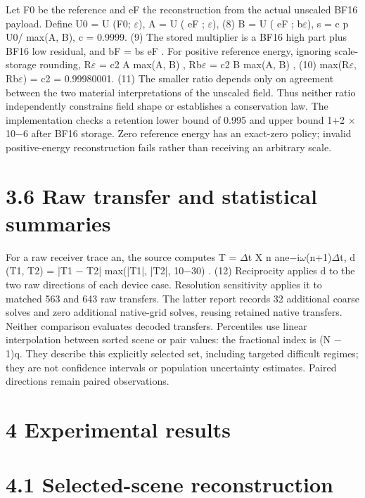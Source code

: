 \documentclass[11pt]{article}
\begin{document}
Let F0 be the reference and eF the reconstruction from the actual unscaled BF16 payload. Define
U0 = U (F0; \ensuremath{\varepsilon}), A = U ( eF ; \ensuremath{\varepsilon}), (8)
B = U ( eF ; b\ensuremath{\varepsilon}), s = c
p
U0/ max(A, B), c = 0.9999. (9)
The stored multiplier is a BF16 high part plus BF16 low residual, and bF = bs eF . For positive
reference energy, ignoring scale-storage rounding,
R\ensuremath{\varepsilon} = c2 A
max(A, B) , Rb\ensuremath{\varepsilon} = c2 B
max(A, B) , (10)
max(R\ensuremath{\varepsilon}, Rb\ensuremath{\varepsilon}) = c2 = 0.99980001. (11)
The smaller ratio depends only on agreement between the two material interpretations of the
unscaled field. Thus neither ratio independently constrains field shape or establishes a conservation
law. The implementation checks a retention lower bound of 0.995 and upper bound 1+2 \ensuremath{\times}10\ensuremath{-}6 after
BF16 storage. Zero reference energy has an exact-zero policy; invalid positive-energy reconstruction
fails rather than receiving an arbitrary scale.

\section*{3.6 Raw transfer and statistical summaries}

For a raw receiver trace an, the source computes
T = \ensuremath{\Delta}t
X
n
ane\ensuremath{-}i\ensuremath{\omega}(n+1)\ensuremath{\Delta}t, d (T1, T2) = |T1 \ensuremath{-} T2|
max(|T1|, |T2|, 10\ensuremath{-}30) . (12)
Reciprocity applies d to the two raw directions of each device case. Resolution sensitivity applies
it to matched 563 and 643 raw transfers. The latter report records 32 additional coarse solves and
zero additional native-grid solves, reusing retained native transfers. Neither comparison evaluates
decoded transfers.
Percentiles use linear interpolation between sorted scene or pair values: the fractional index
is (N \ensuremath{-} 1)q. They describe this explicitly selected set, including targeted difficult regimes; they
are not confidence intervals or population uncertainty estimates. Paired directions remain paired
observations.

\section*{4 Experimental results}


\section*{4.1 Selected-scene reconstruction}
\end{document}
